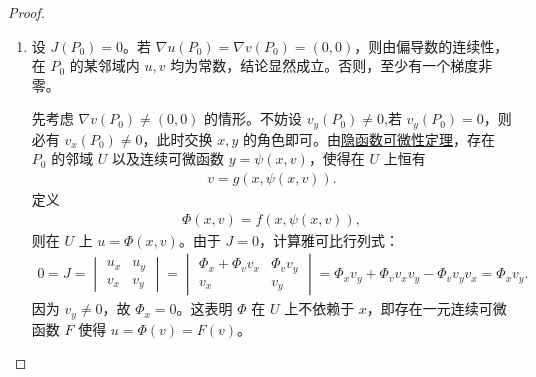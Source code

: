 \documentclass[../../main.tex]{subfiles}%
\begin{document}
\begin{proof}
\begin{enumerate}[(1)]
\item  设 \(J(P_0)=0\)。若 \(\nabla u(P_0)=\nabla v(P_0)=(0,0)\)，则由偏导数的连续性，在 \(P_0\) 的某邻域内 \(u,v\) 均为常数，结论显然成立。否则，至少有一个梯度非零。

先考虑 \(\nabla v(P_0)\ne(0,0)\) 的情形。不妨设 \(v_y(P_0)\ne0\),若 \(v_y(P_0)=0\)，则必有 \(v_x(P_0)\ne0\)，此时交换 \(x,y\) 的角色即可。由\hyperref[theorem:隐函数可微性定理]{隐函数可微性定理}，存在 \(P_0\) 的邻域 \(U\) 以及连续可微函数 \(y=\psi(x,v)\)，使得在 \(U\) 上恒有
\begin{align*}
v=g(x,\psi(x,v)).
\end{align*}
定义
\begin{align*}
\Phi(x,v)=f(x,\psi(x,v)),
\end{align*}
则在 \(U\) 上 \(u=\Phi(x,v)\)。由于 \(J=0\)，计算雅可比行列式：
\begin{align*}
0=J=
\begin{vmatrix}
u_x & u_y\\
v_x & v_y
\end{vmatrix}
=
\begin{vmatrix}
\Phi_x+\Phi_v v_x & \Phi_v v_y\\
v_x & v_y
\end{vmatrix}
=\Phi_x v_y+\Phi_v v_xv_y-\Phi_v v_yv_x=\Phi_x v_y.
\end{align*}
因为 \(v_y\ne0\)，故 \(\Phi_x=0\)。这表明 \(\Phi\) 在 \(U\) 上不依赖于 \(x\)，即存在一元连续可微函数 \(F\) 使得 \(u=\Phi(v)=F(v)\)。


\end{enumerate}
\end{proof}
\end{document}
